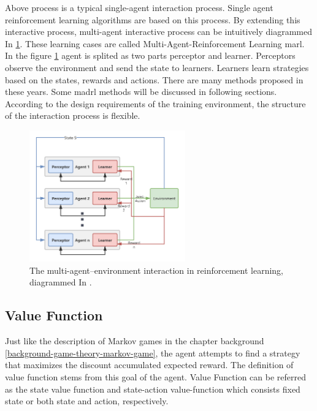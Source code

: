 Above process is a typical single-agent interaction process. Single agent reinforcement learning algorithms are based on this process. By extending this interactive process, multi-agent interactive process can be intuitively diagrammed In \ref{fig:multi-agent-environment-interaction}. These learning cases are called Multi-Agent-Reinforcement Learning \gls{marl}. In the figure \ref{fig:multi-agent-environment-interaction} agent is splited as two parts perceptor and learner. Perceptors observe the environment and send the state to learners. Learners learn strategies based on the states, rewards and actions. There are many methods proposed in these years. Some \gls{madrl} methods will be discussed in following sections. According to the design requirements of the training environment, the structure of the interaction process is flexible.

\begin{figure}[htbp]
\centering
\includegraphics[width=0.6\textwidth]{./images/multi-agent-environment-interaction.png}
\caption{The multi-agent–environment interaction in reinforcement learning, diagrammed In \parencite{en13010123}.}
\label{fig:multi-agent-environment-interaction}
\end{figure}

\subsection{Value Function} \label{background:value-function}
Just like the description of Markov games in the chapter background \ref{background-game-theory-markov-game}, the agent attempts to find a strategy that maximizes the discount accumulated expected reward. The definition of value function stems from this goal of the agent. Value Function can be referred as the state value function and state-action value-function which consists fixed state or both state and action, respectively.

